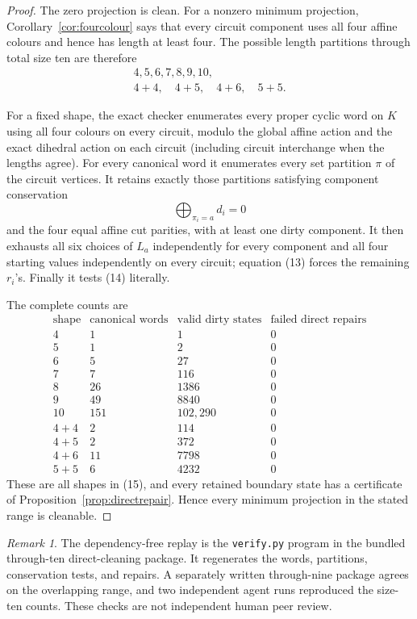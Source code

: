 \documentclass[11pt]{article}
\theoremstyle{definition}
\theoremstyle{remark}
\newtheorem{remark}[theorem]{Remark}
\begin{document}
\begin{proof}
The zero projection is clean.  For a nonzero minimum projection,
Corollary~\ref{cor:fourcolour} says that every circuit component uses all
four affine colours and hence has length at least four.  The possible
length partitions through total size ten are therefore
\[
\begin{gathered}
4,5,6,7,8,9,10,\\
4+4,\quad4+5,\quad4+6,\quad5+5.                         \tag{15}
\end{gathered}
\]

For a fixed shape, the exact checker enumerates every proper cyclic word
on \(K\) using all four colours on every circuit, modulo the global affine
action and the exact dihedral action on each circuit (including circuit
interchange when the lengths agree).  For every canonical word it
enumerates every set partition \(\pi\) of the circuit vertices.  It retains
exactly those partitions satisfying component conservation
\[
                 \bigoplus_{\pi_i=a}d_i=0
\]
and the four equal affine cut parities, with at least one dirty component.
It then exhausts all six choices of \(L_a\) independently for every
component and all four starting values independently on every circuit;
equation (13) forces the remaining \(r_i\)'s.  Finally it tests (14)
literally.

The complete counts are
\[
\begin{array}{c|r|r|r}
\text{shape}&\text{canonical words}&\text{valid dirty states}&
\text{failed direct repairs}\\
\hline
4&1&1&0\\
5&1&2&0\\
6&5&27&0\\
7&7&116&0\\
8&26&1386&0\\
9&49&8840&0\\
10&151&102{,}290&0\\
4+4&2&114&0\\
4+5&2&372&0\\
4+6&11&7798&0\\
5+5&6&4232&0
\end{array}
\]
These are all shapes in (15), and every retained boundary state has a
certificate of Proposition~\ref{prop:directrepair}.  Hence every minimum
projection in the stated range is cleanable.
\end{proof}

\begin{remark}
The dependency-free replay is the \texttt{verify.py} program in the
bundled through-ten direct-cleaning package.
It regenerates the words, partitions, conservation tests, and repairs.
A separately written through-nine package agrees on the overlapping
range, and two independent agent runs reproduced the size-ten counts.
These checks are not independent human peer review.
\end{remark}
\end{document}
